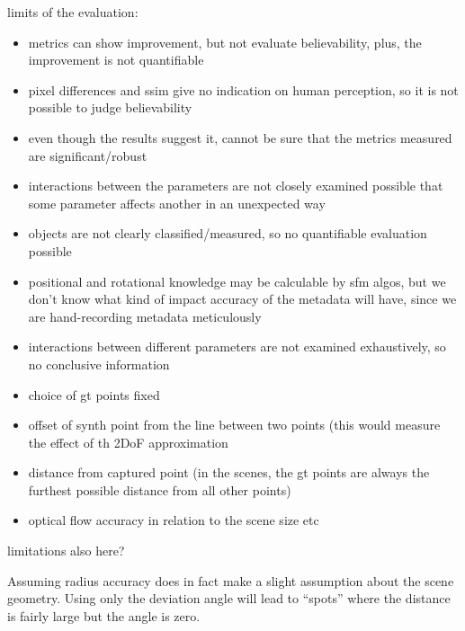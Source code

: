 limits of the evaluation:
\begin{itemize}
  \item metrics can show improvement, but not evaluate believability, plus, the improvement is not quantifiable
  \item pixel differences and ssim give no indication on human perception, so it is not possible to judge believability
  \item even though the results suggest it, cannot be sure that the metrics measured are significant/robust
  \item interactions between the parameters are not closely examined \ar possible that some parameter affects another in an unexpected way
  \item objects are not clearly classified/measured, so no quantifiable evaluation possible
  \item positional and rotational knowledge may be calculable by sfm algos, but we don't know what kind of impact accuracy of the metadata will have, since we are hand-recording metadata meticulously
  \item interactions between different parameters are not examined exhaustively, so no conclusive information
\end{itemize}

\begin{itemize}
  \item choice of gt points \ar fixed
  \item \ar offset of synth point from the line between two points (this would measure the effect of th 2DoF approximation
  \item distance from captured point (in the scenes, the gt points are always the furthest possible distance from all other points)
  \item optical flow accuracy in relation to the scene size etc
\end{itemize}
limitations also here?

Assuming radius accuracy does in fact make a slight assumption about the scene geometry. Using only the deviation angle will lead to ``spots'' where the distance is fairly large but the angle is zero. 

